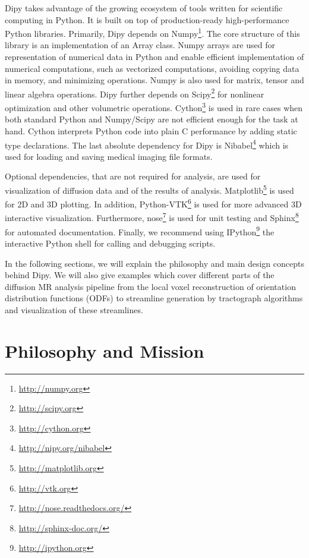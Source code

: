 \documentclass{bioinfo}
\begin{document}
Dipy takes advantage of the growing ecosystem of tools written for scientific
computing in Python. It is built on top of production-ready high-performance
Python libraries. Primarily, Dipy depends on
Numpy\footnote{\url{http://numpy.org}}. The core structure of this library is
an implementation of an Array \citep{van_numpy:11} class. Numpy arrays are used
for representation of numerical data in Python and enable efficient
implementation of numerical computations, such as vectorized computations,
avoiding copying data in memory, and minimizing operations. Numpy is also used
for matrix, tensor and linear algebra operations.  Dipy further depends on
Scipy\footnote{\url{http://scipy.org}} for nonlinear optimization and other
volumetric operations. Cython\footnote{\url{http://cython.org}} is used in rare
cases when both standard Python and Numpy/Scipy are not efficient enough for
the task at hand. Cython interprets Python code into plain C performance by
adding static type declarations. The last absolute dependency for Dipy is
Nibabel\footnote{\url{http://nipy.org/nibabel}} which is used for loading and
saving medical imaging file formats.


Optional dependencies, that are not required for analysis, are used for
visualization of diffusion data and of the results of
analysis. Matplotlib\footnote{\url{http://matplotlib.org}} is used for 2D and
3D plotting. In addition, Python-VTK\footnote{\url{http://vtk.org}} is used for
more advanced 3D interactive visualization. Furthermore, nose\footnote{\url{http://nose.readthedocs.org/}} 
is used for unit
testing and Sphinx\footnote{\url{http://sphinx-doc.org/}} for automated
documentation. Finally, we recommend using
IPython\footnote{\url{http://ipython.org}} the interactive Python shell for
calling and debugging scripts.

In the following sections, we will explain the philosophy and main design
concepts behind Dipy. We will also give examples which cover different parts of
the diffusion MR analysis pipeline from the local voxel reconstruction of
orientation distribution functions (ODFs) to streamline generation by
tractograph algorithms and visualization of these streamlines.

\section{Philosophy and Mission}
\end{document}
